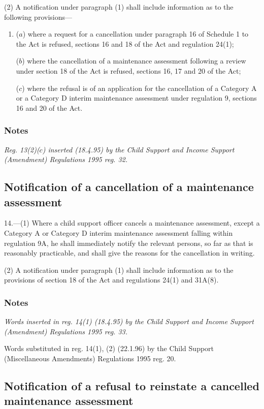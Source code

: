 \documentclass[a4paper]{article}
\newcommand\amendment[1]{\subsubsection*{Notes}{\itshape\frenchspacing\footnotesize #1 \par}}
\begin{document}
(2) A notification under paragraph (1) shall include information as to the following provisions—
\begin{enumerate}\item[]
($a$) where a request for a cancellation under paragraph 16 of Schedule 1 to the Act is refused, sections 16 and 18 of the Act and regulation 24(1);

($b$) where the cancellation of a maintenance assessment following a review under section 18 of the Act is refused, sections 16, 17 and 20 of the Act;

($c$) where the refusal is of an application for the cancellation of a Category A or a Category D interim maintenance assessment under regulation 9, sections 16 and 20 of the Act.
\end{enumerate}

\amendment{
Reg. 13(2)($c$) inserted (18.4.95) by the Child Support and Income Support (Amendment) Regulations 1995 reg. 32.
}

\subsection[14. Notification of a cancellation of a maintenance assessment]{Notification of a cancellation of a maintenance assessment}

14.—(1) Where a child support officer cancels a maintenance assessment, 
except a Category A or Category D interim maintenance assessment falling within 
  regulation 9A, %
he shall immediately notify the relevant persons, so far as that is reasonably practicable, and shall give the reasons for the cancellation in writing.

(2) A notification under paragraph (1) shall include information as to the provisions of section 18 of the Act and regulations 24(1) and 
31A(8).  %

\amendment{
Words inserted in reg. 14(1) (18.4.95) by the Child Support and Income Support (Amendment) Regulations 1995 reg. 33.

Words substituted in reg. 14(1), (2) (22.1.96) by the Child Support (Miscellaneous Amendments) Regulations 1995 reg. 20.
}

\subsection[15. Notification of a refusal to reinstate a cancelled maintenance assessment]{Notification of a refusal to reinstate a cancelled maintenance assessment}
\end{document}

